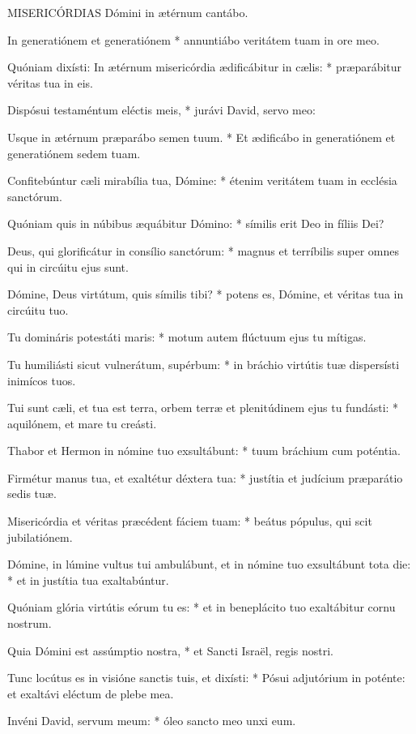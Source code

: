 
\lettrine[lines=2]{M}{ISERICÓRDIAS} Dómini in ætérnum cantábo.

In generatiónem et generatiónem * annuntiábo veritátem tuam in ore meo.

Quóniam dixísti: In ætérnum misericórdia ædificábitur in cælis: * præparábitur véritas tua in eis.

Dispósui testaméntum eléctis meis, * jurávi David, servo meo:

Usque in ætérnum præparábo semen tuum. * Et ædificábo in generatiónem et generatiónem sedem tuam.

Confitebúntur cæli mirabília tua, Dómine: * étenim veritátem tuam in ecclésia sanctórum.

Quóniam quis in núbibus æquábitur Dómino: * símilis erit Deo in fíliis Dei?

Deus, qui glorificátur in consílio sanctórum: * magnus et terríbilis super omnes qui in circúitu ejus sunt.

Dómine, Deus virtútum, quis símilis tibi? * potens es, Dómine, et véritas tua in circúitu tuo.

Tu domináris potestáti maris: * motum autem flúctuum ejus tu mítigas.

Tu humiliásti sicut vulnerátum, supérbum: * in bráchio virtútis tuæ dispersísti inimícos tuos.

Tui sunt cæli, et tua est terra, orbem terræ et plenitúdinem ejus tu fundásti: * aquilónem, et mare tu creásti.

Thabor et Hermon in nómine tuo exsultábunt: * tuum bráchium cum poténtia.

Firmétur manus tua, et exaltétur déxtera tua: * justítia et judícium præparátio sedis tuæ.

Misericórdia et véritas præcédent fáciem tuam: * beátus pópulus, qui scit jubilatiónem.

Dómine, in lúmine vultus tui ambulábunt, et in nómine tuo exsultábunt tota die: * et in justítia tua exaltabúntur.

Quóniam glória virtútis eórum tu es: * et in beneplácito tuo exaltábitur cornu nostrum.

Quia Dómini est assúmptio nostra, * et Sancti Israël, regis nostri.

Tunc locútus es in visióne sanctis tuis, et dixísti: * Pósui adjutórium in poténte: et exaltávi eléctum de plebe mea.

Invéni David, servum meum: * óleo sancto meo unxi eum.

